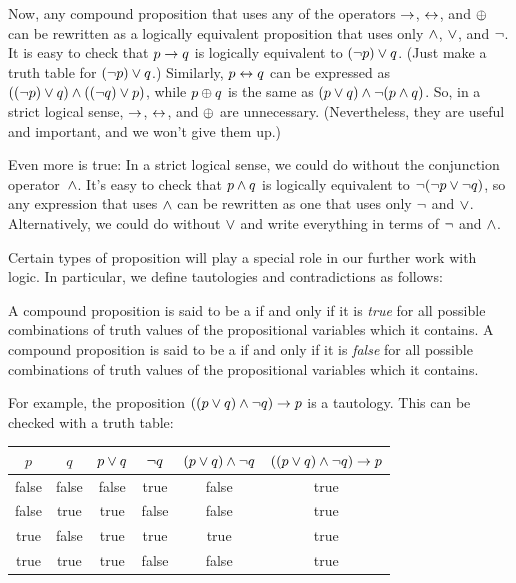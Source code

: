 \medbreak

Now, any compound proposition that uses any of the operators
$\rightarrow$, $\leftrightarrow$, and $\oplus$ can be rewritten as a logically
equivalent proposition that uses only $\wedge$, $\vee$, and $\lnot$.
It is easy to check that $p\rightarrow q$ is logically equivalent
to $(\lnot p)\vee q$.  (Just make a truth table for $(\lnot p)\vee q$.)
Similarly, $p\leftrightarrow q$ can be expressed as $((\lnot p) \vee q)\wedge ((\lnot q)\vee p)$,
while $p\oplus q$ is the same as $(p\vee q)\wedge\lnot(p\wedge q)$.
So, in a strict logical sense, $\rightarrow$, $\leftrightarrow$, and $\oplus$ are
unnecessary.  (Nevertheless, they are useful and important, and
we won't give them up.)

Even more is true:  In a strict logical sense, we could do without
the conjunction operator~$\wedge$.  It's easy to check that
$p\wedge q$ is logically equivalent to $\lnot(\lnot p\vee\lnot q)$,
so any expression that uses $\wedge$ can be rewritten as one that
uses only $\lnot$ and $\vee$.  Alternatively, we could do without
$\vee$ and write everything in terms of $\lnot$ and $\wedge$.

\medbreak

Certain types of proposition will play a special role in our
further work with logic.  In particular, we define tautologies
and contradictions as follows:

\begin{definition}
A compound proposition is said to be a  if and only if
it is \emph{true} for all possible combinations of truth values of
the propositional variables which it contains.  
A compound proposition is said to be a  if and only if
it is \emph{false} for all possible combinations of truth values of
the propositional variables which it contains.  
\end{definition}


For example, the proposition $((p\vee q)\wedge \lnot q)\rightarrow p$ is a tautology.
This can be checked with a truth table:

\begin{center}
   \begin{tabular}{|c|c||c|c|c|c|}
      \hline
      $p$&   $q$&   $p\vee q$&  $\lnot q$&  $(p\vee q)\wedge \lnot q$& $((p\vee q)\wedge \lnot q)\rightarrow p$\\
      \hline
      \strut false& false& false&     true&      false&                 true\\
      false& true&  true&      false&     false&                 true\\
      true&  false& true&      true&      true&                  true\\
      true&  true&  true&      false&     false&                 true\\
      \hline
   \end{tabular}
\end{center}



